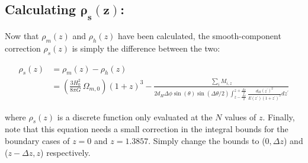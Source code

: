 \documentclass[12pt]{article}
\begin{document}
\subsection*{Calculating $\bm{\rho_s(z)}$:}

Now that $\rho_m(z)$ and $\rho_h(z)$ have been calculated, the smooth-component correction $\rho_s(z)$ is simply the difference between the two:

\begin{align}\label{smooth_component} 
\rho_s(z)&=\rho_m(z)-\rho_h(z)\nonumber\\
&=\left(\frac{3H_0^2}{8\pi G}\,\Omega_{m,0}\right)(1+z)^3 - \frac{\sum_i M_{i,z}}{2d_H\Delta\phi\sin(\theta)\sin(\Delta\theta/2)\int_{z-\frac{\Delta z}{2}}^{z+\frac{\Delta z}{2}} \frac{d_M(z^\prime)^2}{E(z^\prime)(1+z^\prime)^3}dz^\prime}
\end{align}

where $\rho_s(z)$ is a discrete function only evaluated at the $N$ values of $z$. Finally, note that this equation needs a small correction in the integral bounds for the boundary cases of $z=0$ and $z=1.3857$. Simply change the bounds to ($0,\Delta z$) and ($z-\Delta z,z$) respectively.
\end{document}
